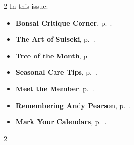 \setlength{\columnsep}{-5.0cm}
\begin{multicols}{2}
    \noindent\textsf{In this issue:}
    \begin{itemize}
        \item \textsf{\textbf{Bonsai Critique Corner}}, p.~\pageref{2024-12-critique}.
        \item \textsf{\textbf{The Art of Suiseki}}, p.~\pageref{2024-12-suiseki}.
        \item \textsf{\textbf{Tree of the Month}}, p.~\pageref{2024-12-contest}.
        \item \textsf{\textbf{Seasonal Care Tips}}, p.~\pageref{2024-12-care}.
        \item \textsf{\textbf{Meet the Member}}, p.~\pageref{2024-12-roots}.
        \item \textsf{\textbf{Remembering Andy Pearson}}, p.~\pageref{2024-12-pearson}.
        \item \textsf{\textbf{Mark Your Calendars}}, p.~\pageref{2024-12-events}.
    \end{itemize}
    \vfill\null
    \columnbreak

    
\end{multicols}
\pagebreak

\setlength{\columnsep}{0.5cm}
\begin{multicols}{2}
    
    
    
    
    
    
    
\end{multicols}
